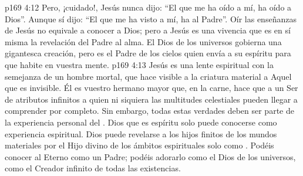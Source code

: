 \vs p169 4:12 Pero, ¡cuidado!, Jesús nunca dijo: “El que me ha oído a mí, ha oído a Dios”. Aunque sí dijo: “El que me ha visto a mí, ha  al Padre”. Oír las enseñanzas de Jesús no equivale a conocer a Dios; pero  a Jesús es una vivencia que es en sí misma la revelación del Padre al alma. El Dios de los universos gobierna una gigantesca creación, pero es el Padre de los cielos quien envía a su espíritu para que habite en vuestra mente.
\vs p169 4:13 Jesús es una lente espiritual con la semejanza de un hombre mortal, que hace visible a la criatura material a Aquel que es invisible. Él es vuestro hermano mayor que, en la carne, hace que  a un Ser de atributos infinitos a quien ni siquiera las multitudes celestiales pueden llegar a comprender por completo. Sin embargo, todas estas verdades deben ser parte de la experiencia personal del . Dios que es espíritu solo puede conocerse como experiencia espiritual. Dios puede revelarse a los hijos finitos de los mundos materiales por el Hijo divino de los ámbitos espirituales solo como . Podéis conocer al Eterno como un Padre; podéis adorarlo como el Dios de los universos, como el Creador infinito de todas las existencias.
